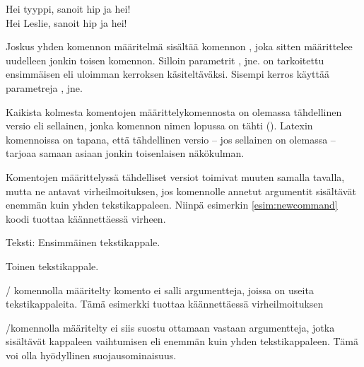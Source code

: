 \begin{tulossis}
  Hei tyyppi, sanoit hip ja hei! \\
  Hei Leslie, sanoit hip ja hei!
\end{tulossis}

Joskus yhden komennon määritelmä sisältää komennon
, joka sitten määrittelee uudelleen jonkin toisen
komennon. Silloin parametrit ,  jne. on
tarkoitettu ensimmäisen eli uloimman kerroksen käsiteltäväksi. Sisempi
kerros käyttää parametreja ,  jne.

Kaikista kolmesta komentojen määrittelykomennosta on olemassa
tähdellinen versio eli sellainen, jonka komennon nimen lopussa on tähti
(\koodi{*}). Latexin komennoissa on tapana, että tähdellinen versio --
jos sellainen on olemassa -- tarjoaa samaan asiaan jonkin toisenlaisen
näkökulman.

\begin{koodilohkosis}
\newcommand*     {\nimi}[n][oletus]{määritelmä}
\renewcommand*   {\nimi}[n][oletus]{määritelmä}
\providecommand* {\nimi}[n][oletus]{määritelmä}
\end{koodilohkosis}

Komentojen määrittelyssä tähdelliset versiot toimivat muuten samalla
tavalla, mutta ne antavat virheilmoituksen, jos komennolle annetut
argumentit sisältävät enemmän kuin yhden tekstikappaleen. Niinpä
esimerkin \ref{esim:newcommand} koodi tuottaa käännettäessä virheen.

\begin{esimerkki*}
\begin{koodilohko}
\newcommand*{\komento}[1]{Teksti: #1}

\komento{
  Ensimmäinen tekstikappale.

  Toinen tekstikappale.
}
\end{koodilohko}
  \caption{\-/ komennolla määritelty komento ei
    salli argumentteja, joissa on useita tekstikappaleita. Tämä
    esimerkki tuottaa käännettäessä virheilmoituksen}
  \label{esim:newcommand}
\end{esimerkki*}

\-/komennolla määritelty  ei siis
suostu ottamaan vastaan argumentteja, jotka sisältävät kappaleen
vaihtumisen eli enemmän kuin yhden tekstikappaleen. Tämä voi olla
hyödyllinen suojausominaisuus.

